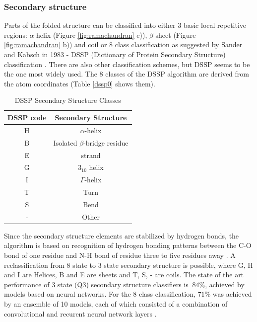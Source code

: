 \subsubsection{Secondary structure}

Parts of the folded structure can be classified into either 3 basic local repetitive regions: $\alpha$ helix (Figure \ref{fig:ramachandran} c)), $\beta$ sheet (Figure \ref{fig:ramachandran} b)) and coil or 8 class classification as suggested by Sander and Kabsch in 1983 - DSSP (Dictionary of Protein Secondary Structure) classification \cite{dssp2}. There are also other classification schemes, but DSSP seems to be the one most widely used. 
The 8 classes of the DSSP algorithm are derived from the atom coordinates (Table \ref{dssp0} shows them).

\begin{table}[ht]
    \centering
    \begin{tabular}{c|c}
        DSSP code & Secondary Structure\\ 
        \hline
        H     & $\alpha$-helix \\
        B     & Isolated $\beta$-bridge residue \\
        E     & strand \\
        G     & $3_{10}$ helix \\
        I     & $\Gamma$-helix \\
        T     & Turn \\
        S     & Bend \\
        -     & Other 
    \end{tabular}
    \caption{DSSP Secondary Structure Classes}
    \label{tab:dssp0}
\end{table}

Since the secondary structure elements are stabilized by hydrogen bonds, the algorithm is based on recognition of hydrogen bonding patterns between the C-O bond of one residue and N-H bond of residue three to five residues away \cite{dssp2}. A reclassification from 8 state to 3 state secondary structure is possible, where G, H and I are Helices, B and E are sheets and T, S, - are coils. The state of the art performance of 3 state (Q3) secondary structure classifiers is $~84\%$, achieved by models based on neural networks. For the 8 class classification, $71\%$ was achieved by an ensemble of 10 models, each of which consisted of a combination of convolutional and recurent neural network layers \cite{dssp_sec}. 



